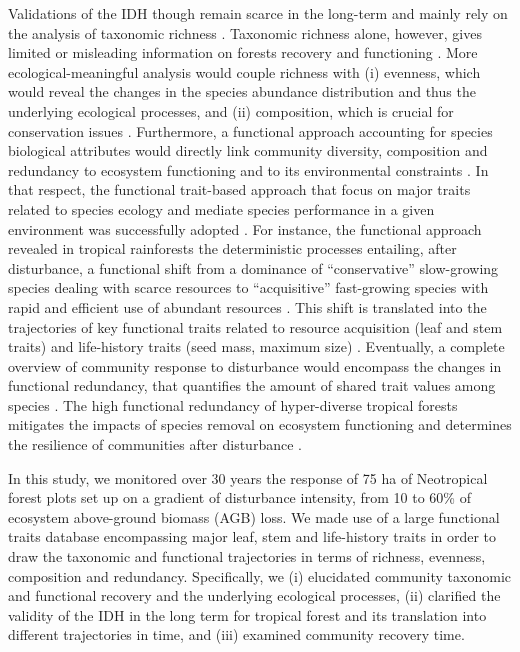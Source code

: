 \documentclass[
  11pt,
  french,
  A4paper,
  extrafontsizes,onecolumn,openright
  ]{memoir}
\begin{document}
Validations of the IDH though remain scarce in the long-term and mainly
rely on the analysis of taxonomic richness \autocite{Molino2001}.
Taxonomic richness alone, however, gives limited or misleading
information on forests recovery and functioning
\autocite{Chaudhary2016}. More ecological-meaningful analysis would
couple richness with (i) evenness, which would reveal the changes in the
species abundance distribution and thus the underlying ecological
processes, and (ii) composition, which is crucial for conservation
issues \autocites{Lavorel2002}{Bellwood2006}. Furthermore, a functional
approach accounting for species biological attributes would directly
link community diversity, composition and redundancy to ecosystem
functioning and to its environmental constraints
\autocites{Violle2007b}{Baraloto2012}. In that respect, the functional
trait-based approach that focus on major traits related to species
ecology and mediate species performance in a given environment was
successfully adopted \autocite{Diaz2005}. For instance, the functional
approach revealed in tropical rainforests the deterministic processes
entailing, after disturbance, a functional shift from a dominance of
``conservative'' slow-growing species dealing with scarce resources to
``acquisitive'' fast-growing species with rapid and efficient use of
abundant resources \autocites{Reich2014}{Herault2011}. This shift is
translated into the trajectories of key functional traits related to
resource acquisition (leaf and stem traits) and life-history traits
(seed mass, maximum size)
\autocites{Wright2004}{TerSteege2006}{Westoby2006a}{Chave2009b}.
Eventually, a complete overview of community response to disturbance
would encompass the changes in functional redundancy, that quantifies
the amount of shared trait values among species \autocite{Carmona2016}.
The high functional redundancy of hyper-diverse tropical forests
\autocite{Bellwood2006} mitigates the impacts of species removal on
ecosystem functioning and determines the resilience of communities after
disturbance \autocites{Elmqvist2003}{Diaz2005}.

In this study, we monitored over 30 years the response of 75 ha of
Neotropical forest plots set up on a gradient of disturbance intensity,
from 10 to 60\% of ecosystem above-ground biomass (AGB) loss. We made
use of a large functional traits database encompassing major leaf, stem
and life-history traits in order to draw the taxonomic and functional
trajectories in terms of richness, evenness, composition and redundancy.
Specifically, we (i) elucidated community taxonomic and functional
recovery and the underlying ecological processes, (ii) clarified the
validity of the IDH in the long term for tropical forest and its
translation into different trajectories in time, and (iii) examined
community recovery time.
\end{document}
